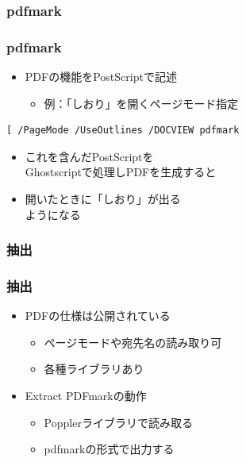 \documentclass[unicode,17pt]{beamer}
\begin{document}
\subsubsection{pdfmark}
\begin{frame}[fragile]\frametitle{pdfmark}
  \begin{itemize}
  \item PDFの機能をPostScriptで記述
    \begin{itemize}
    \item 例：「しおり」を開くページモード指定
    \end{itemize}
  \end{itemize}
  \centering
  \begin{tcolorbox}[width=0.6\linewidth,left=0mm,right=0mm,top=0mm,bottom=0mm]
    \begin{lstlisting}
[ /PageMode /UseOutlines /DOCVIEW pdfmark
    \end{lstlisting}
  \end{tcolorbox}
  \begin{itemize}
  \item これを含んだPostScriptを\\
    Ghostscriptで処理しPDFを生成すると
  \item 開いたときに「しおり」が出る\\
    ようになる
  \end{itemize}
\end{frame}

\subsubsection{抽出}
\begin{frame}\frametitle{抽出}
  \begin{itemize}
  \item PDFの仕様は公開されている
    \begin{itemize}
    \item ページモードや宛先名の読み取り可
    \item 各種ライブラリあり
    \end{itemize}
  \item Extract PDFmarkの動作
    \begin{itemize}
    \item Popplerライブラリで読み取る
    \item pdfmarkの形式で出力する
    \end{itemize}
  \end{itemize}
\end{frame}
\end{document}
